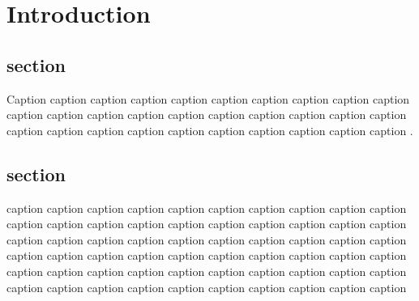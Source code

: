 \section{Introduction}
\subsection{section}
Caption caption caption caption caption caption caption caption caption caption caption caption caption caption caption caption caption caption caption caption caption caption caption caption caption caption caption caption caption caption \cite{parkhi2012cats}. 


\subsection{section}
 caption caption caption caption caption caption caption caption caption caption caption caption caption caption caption caption caption caption caption caption caption caption caption caption caption caption caption caption caption caption caption caption caption caption caption caption caption caption caption caption caption caption caption caption caption caption caption caption caption caption caption caption caption caption caption caption caption caption caption caption